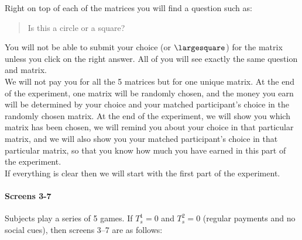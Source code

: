 \documentclass[11pt]{article}
\begin{document}
\begin{tcolorbox}
Right on top of each of the matrices you will find a question such as:
\begin{quote}
\begin{center}
{\Huge \textbigcircle}
\end{center}
 \centering Is this a circle or a square?
\end{quote}
You will not be able to submit your choice (\textbigcircle or $\largesquare$) for the matrix unless you click on the right answer. All of you will see exactly the same question and matrix. \\

We will not pay you for all the 5 matrices but for one unique matrix. At the end of the experiment, one matrix will be randomly chosen, and the money you earn will be determined by your choice and your matched participant's choice in the randomly chosen matrix. At the end of the experiment, we will show you which matrix has been chosen, we will remind you about your choice in that particular matrix, and we will also show you your matched participant's choice in that particular matrix, so that you know how much you have earned in this part of the experiment.\\

If everything is clear then we will start with the first part of the experiment.
\end{tcolorbox}



\paragraph{Screens 3-7} Subjects play a series of 5 games. If $T_s^1=0$ and $T_s^2=0$ (regular payments and no social cues), then screens 3--7 are as follows:
\end{document}
